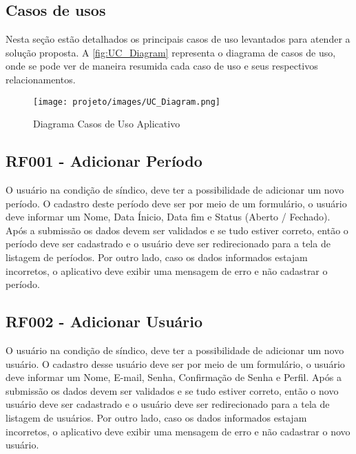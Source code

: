 \documentclass[12pt]{article}
\begin{document}
\begin{appendices}

\section{Casos de usos}
\label{appendice_use_case}
Nesta seção estão detalhados os principais casos de uso levantados para atender a solução proposta. A \autoref{fig:UC_Diagram} representa o diagrama de casos de uso, onde se pode ver de maneira resumida cada caso de uso e seus respectivos relacionamentos.

\begin{figure}[!ht]
  \centering
  \texttt{[image: projeto/images/UC\_Diagram.png]}
  \caption{Diagrama Casos de Uso Aplicativo}
  \label{fig:UC_Diagram}
\end{figure}

\subsection{RF001 - Adicionar Período}
\label{sec:rf001}
O usuário na condição de síndico, deve ter a possibilidade de adicionar um novo período. O cadastro deste período deve ser por meio de um formulário, o usuário deve informar um Nome, Data Ínicio, Data fim e Status (Aberto / Fechado). Após a submissão os dados devem ser validados e se tudo estiver correto, então o período deve ser cadastrado e o usuário deve ser redirecionado para a tela de listagem de períodos. Por outro lado, caso os dados informados estajam incorretos, o aplicativo deve exibir uma mensagem de erro e não cadastrar o período.

\subsection{RF002 - Adicionar Usuário}
O usuário na condição de síndico, deve ter a possibilidade de adicionar um novo usuário. O cadastro desse usuário deve ser por meio de um formulário, o usuário deve informar um Nome, E-mail, Senha, Confirmação de Senha e Perfil. Após a submissão os dados devem ser validados e se tudo estiver correto, então o novo usuário deve ser cadastrado e o usuário deve ser redirecionado para a tela de listagem de usuários. Por outro lado, caso os dados informados estajam incorretos, o aplicativo deve exibir uma mensagem de erro e não cadastrar o novo usuário.


\end{appendices}
\end{document}
